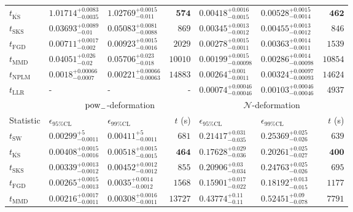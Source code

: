 \begin{tabular}{l|llr|llr}
	$t_{\overline{\mathrm{KS}}}$ & $1.01714_{-0.0035}^{+0.0083}$ & $1.02769_{-0.011}^{+0.0015}$ & ${\mathbf{574}}$ & $0.00418_{-0.0015}^{+0.0016}$ & $0.00528_{-0.0014}^{+0.0015}$ & ${\mathbf{462}}$ \\
	$t_{\mathrm{SKS}}$ & $0.03693_{-0.01}^{+0.0089}$ & $0.05083_{-0.0088}^{+0.0081}$ & $869$ & $0.00345_{-0.0012}^{+0.0013}$ & $0.00455_{-0.0012}^{+0.0013}$ & $846$ \\
	$t_{\mathrm{FGD}}$ & ${\mathbf{0.00711_{-0.002}^{+0.0017}}}$ & ${\mathbf{0.00923_{-0.0016}^{+0.0015}}}$ & $2029$ & $0.00278_{-0.0011}^{+0.0015}$ & $0.00363_{-0.0011}^{+0.0014}$ & $1539$ \\
	$t_{\mathrm{MMD}}$ & $0.04051_{-0.02}^{+0.026}$ & $0.05706_{-0.018}^{+0.023}$ & $10010$ & ${\mathbf{0.00199_{-0.00098}^{+0.0015}}}$ & ${\mathbf{0.00286_{-0.00098}^{+0.0014}}}$ & $10854$ \\
\rowcolor{red!35}	$t_{\mathrm{NPLM}}$ & $0.0018_{-0.0007}^{+0.00066}$ & $0.00221_{-0.00063}^{+0.00066}$ & $14883$ & $0.00264_{-0.0011}^{+0.001}$ & $0.00324_{-0.00093}^{+0.00097}$ & $14624$ \\
	$t_{\mathrm{LLR}}$ & - & - & - & $0.00074_{-0.00046}^{+0.00046}$ & $0.00103_{-0.00046}^{+0.00046}$ & $4937$ \\
	\toprule
	\multicolumn{1}{c}{} & \multicolumn{3}{c}{$\rm{pow}_{-}$-deformation} & \multicolumn{3}{c}{$\mathcal{N}$-deformation} \\
	Statistic & $\epsilon_{95\%\mathrm{CL}}$ & $\epsilon_{99\%\mathrm{CL}}$ & $t$ (s) & $\epsilon_{95\%\mathrm{CL}}$ & $\epsilon_{99\%\mathrm{CL}}$ & $t$ (s) \\
	\midrule
	$t_{\mathrm{SW}}$ & $0.00299_{-0.0011}^{+5}$ & $0.00411_{-0.0011}^{+5}$ & $681$ & $0.21417_{-0.035}^{+0.031}$ & $0.25369_{-0.026}^{+0.025}$ & $639$ \\
	$t_{\overline{\mathrm{KS}}}$ & $0.00408_{-0.0016}^{+0.0015}$ & $0.00518_{-0.0015}^{+0.0015}$ & ${\mathbf{464}}$ & $0.17628_{-0.036}^{+0.029}$ & $0.20261_{-0.027}^{+0.025}$ & ${\mathbf{400}}$ \\
	$t_{\mathrm{SKS}}$ & $0.00339_{-0.0012}^{+0.0013}$ & $0.00452_{-0.0012}^{+0.0012}$ & $855$ & $0.20906_{-0.034}^{+0.03}$ & $0.24763_{-0.026}^{+0.025}$ & $695$ \\
	$t_{\mathrm{FGD}}$ & $0.00265_{-0.0013}^{+0.0015}$ & $0.0035_{-0.0012}^{+0.0014}$ & $1568$ & ${\mathbf{0.15901_{-0.022}^{+0.017}}}$ & ${\mathbf{0.18192_{-0.015}^{+0.013}}}$ & $1177$ \\
	$t_{\mathrm{MMD}}$ & ${\mathbf{0.00216_{-0.0011}^{+0.0017}}}$ & ${\mathbf{0.00308_{-0.0011}^{+0.0016}}}$ & $13727$ & $0.43774_{-0.11}^{+0.11}$ & $0.52451_{-0.078}^{+0.09}$ & $7791$ \\

\end{tabular}
